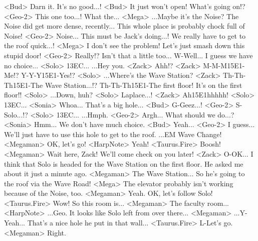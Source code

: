 <Bud> Darn it. It's no good...! 
<Bud> It just won't open! What's going on!? 
<Geo-2> This one too...! 
What the... 
<Mega> ...Maybe it's the Noise? 
The Noise did get more dense, recently... 
This whole place is probably chock full of Noise! 
<Geo-2> Noise... This must be Jack's doing...! 
We really have to get to the roof quick...! 
<Mega> I don't see the problem! 
Let's just smash down this stupid door! 
<Geo-2> Really!? Isn't that a little too... 
W-Well... I guess we have no choice... 
<Solo> {13}{EC}... 
...Hey you. 
<Zack> Ahh!? 
<Zack> M-M-M{15}{E1}-Me!? 
Y-Y-Y{15}{E1}-Yes!? 
<Solo> ...Where's the Wave Station? 
<Zack> Th-Th-Th{15}{E1}-The Wave Station...!? 
Th-Th-Th{15}{E1}-The first floor! It's on the first floor!! 
<Solo> ...Down, huh? 
<Solo> Laplace...! 
<Zack> Ah{15}{E1}hhhhh! 
<Solo> {13}{EC}... 
<Sonia> Whoa... 
That's a big hole... 
<Bud> G-Geez...! 
<Geo-2> S-Solo...!? 
<Solo> {13}{EC}... 
...Hmph. 
<Geo-2> Argh... What should we do...? 
<Sonia> Hmm... We don't have much choice. 
<Bud> Yeah... 
<Geo-2> I guess... 
We'll just have to use this hole to get to the roof. 
...EM Wave Change! 
<Megaman> OK, let's go! 
<HarpNote> Yeah! 
<Taurus.Fire> Boosh! 
<Megaman> Wait here, Zack! 
We'll come check on you later! 
<Zack> O-OK... 
I think that Solo is headed for the Wave Station on the first floor. 
He asked me about it just a minute ago. 
<Megaman> The Wave Station... So he's going to the roof via the Wave Road! 
<Mega> The elevator probably isn't working because of the Noise, too. 
<Megaman> Yeah. OK, let's follow Solo! 
<Taurus.Fire> Wow! 
So this room is... 
<Megaman> The faculty room... 
<HarpNote> ...Geo. It looks like Solo left from over there... 
<Megaman> ...Y-Yeah... 
That's a nice hole he put in that wall... 
<Taurus.Fire> L-Let's go. 
<Megaman> Right. 
